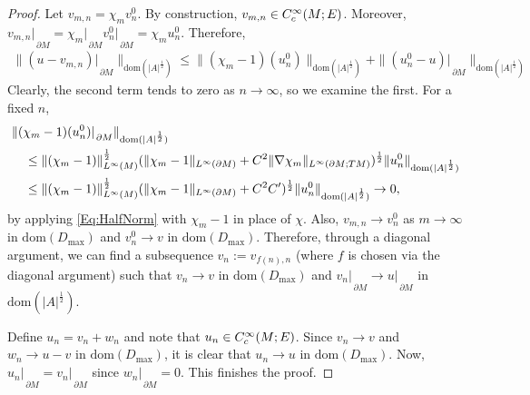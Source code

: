 \documentclass[a4paper,10pt,reqno]{amsart}
\newcommand{\rest}[1]{{{\lvert_{}}_{}}_{#1}}
\newcommand{\modulus}[1]{|#1|}
\newcommand{\norm}[1]{\| #1 \|}%
\newcommand{\Lp}[2][{}]{{\rm L}^{#2}_{\rm #1}}%
\newcommand{\Ck}[2][{}]{{\rm C}^{#2}_{\rm #1}}%
\newcommand{\dom}{\mathrm{dom}}
\newcommand{\dM}{\partial M}
\theoremstyle{definition}
\begin{document}
\begin{proof}
Let $v_{m,n} = \chi_m v_n^0$.
By construction, $v_{m,n} \in \Ck[c]{\infty}(M;E)$.
Moreover, $v_{m,n}\rest{\dM} = \chi_m\rest{\dM} v_n^0\rest{\dM} = \chi_m u_n^0 $.
Therefore,
\begin{align*}
 \norm{(u  - v_{m,n})\rest{\dM}}_{\dom(\modulus{A}^{\frac12})}                                                                 
 \leq \norm{(\chi_m -1)(u_n^0)}_{\dom(\modulus{A}^{\frac12})}  + \norm{(u_n^0 -u)\rest{\dM}}_{\dom(\modulus{A}^{\frac12})}
\end{align*}
Clearly, the second term tends to zero as $n \to \infty$, so we examine the first.
For a fixed $n$,
\begin{align*}
 & \norm{(\chi_m -1)(u_n^0)\rest{\dM}}_{\dom(\modulus{A}^{\frac12})}                                                                                                                                    \\
 & \quad\leq \norm{(\chi_m - 1)}_{\Lp{\infty}(M)}^{\frac12}(\norm{\chi_m - 1}_{\Lp{\infty}(\dM)} + C^2 \norm{\nabla \chi_m}_{\Lp{\infty}(\dM;TM)})^{\frac12} \norm{u_n^0}_{\dom(\modulus{A}^{\frac12})} \\
 & \quad\leq \norm{(\chi_m - 1)}_{\Lp{\infty}(M)}^{\frac12}(\norm{\chi_m - 1}_{\Lp{\infty}(\dM)} + C^2C')^{\frac12} \norm{u_n^0}_{\dom(\modulus{A}^{\frac12})}
\to 0,
\end{align*}
by applying \eqref{Eq:HalfNorm} with $\chi_m -1 $ in place of $\chi$.
Also, $v_{m,n} \to v^0_{n}$ as $m \to \infty$ in $\dom(D_{\max})$ and $v^0_{n} \to v$ in $\dom(D_{\max})$.
Therefore, through a diagonal argument, we can find a subsequence $v_n := v_{f(n),n}$ (where $f$ is chosen via the diagonal argument) such that $v_n \to v$ in $\dom(D_{\max})$ and $v_n\rest{\dM} \to u\rest{\dM}$ in $\dom(\modulus{A}^{\frac12})$.

Define $u_n = v_n + w_n$ and note that $u_n \in \Ck[c]{\infty}(M;E)$.
Since $v_n \to v$ and $w_n \to u - v$ in $\dom(D_{\max})$, it is clear that $u_n \to u$ in $\dom(D_{\max})$.
Now, $u_n \rest{\dM} = v_n \rest{\dM}$ since $w_n \rest{\dM} = 0$.
This finishes the proof.
\end{proof}
\end{document}
